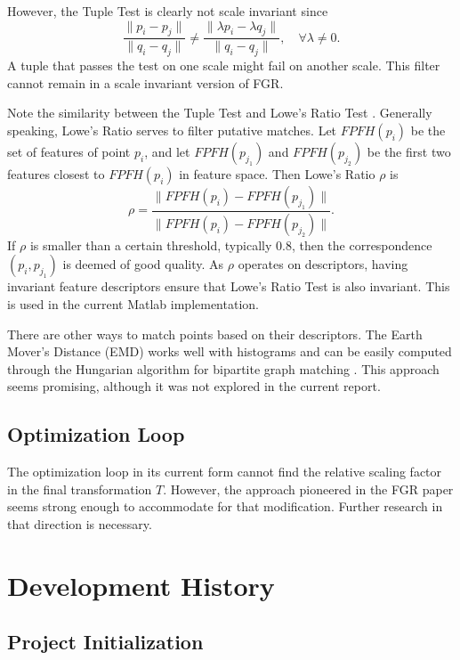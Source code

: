 \documentclass[10pt,a4paper]{article}
\begin{document}
However, the Tuple Test is clearly not scale invariant since
\[
\frac{\|p_i - p_j\|}{\|q_i - q_j\|} \neq \frac{\|\lambda p_i - \lambda q_j\|}{\|q_i - q_j \|},\quad \forall \lambda \neq 0.
\]
A tuple that passes the test on one scale might fail on another scale. This filter cannot remain in a scale invariant version of FGR. 

Note the similarity between the Tuple Test and Lowe's Ratio Test \cite{lowe1999object}. Generally speaking, Lowe's Ratio serves to filter putative matches. Let $FPFH(p_i)$ be the set of features of point $p_i$, and let $FPFH(p_{j_1})$ and $FPFH(p_{j_2})$ be the first two features closest to $FPFH(p_i)$ in feature space. Then Lowe's Ratio $\rho$ is 
\begin{equation}
\rho = \frac{\|FPFH(p_i) - FPFH(p_{j_1})\|}{\|FPFH(p_i) - FPFH(p_{j_2})\|}.
\end{equation}
If $\rho$ is smaller than a certain threshold, typically 0.8, then the correspondence $(p_i,p_{j_1})$ is deemed of good quality.  As $\rho$ operates on descriptors, having invariant feature descriptors ensure that Lowe's Ratio Test is also invariant. This is used in the current Matlab implementation. 

There are other ways to match points based on their descriptors. The Earth Mover's Distance (EMD) works well with histograms and can be easily computed through the Hungarian algorithm for bipartite graph matching \cite{belongie2001shape}. This approach seems promising, although it was not explored in the current report.

\subsection{Optimization Loop}

The optimization loop in its current form cannot find the relative scaling factor in the final transformation $T$. However, the approach pioneered in the FGR paper seems strong enough to accommodate for that modification. Further research in that direction is necessary. 
\newpage
\section{Development History}\label{sec4}

\subsection{Project Initialization}
\end{document}
